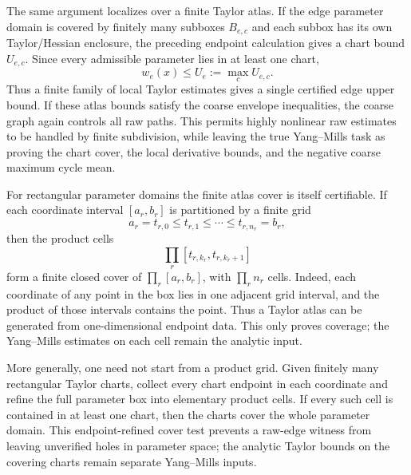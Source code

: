 The same argument localizes over a finite Taylor atlas. If the edge parameter
domain is covered by finitely many subboxes $B_{e,c}$ and each subbox has its
own Taylor/Hessian enclosure, the preceding endpoint calculation gives a
chart bound $U_{e,c}$. Since every admissible parameter lies in at least one
chart,
\[
  w_e(x)\leq U_e:=\max_c U_{e,c}.
\]
Thus a finite family of local Taylor estimates gives a single certified edge
upper bound. If these atlas bounds satisfy the coarse envelope inequalities,
the coarse graph again controls all raw paths. This permits highly nonlinear
raw estimates to be handled by finite subdivision, while leaving the true
Yang--Mills task as proving the chart cover, the local derivative bounds, and
the negative coarse maximum cycle mean.

For rectangular parameter domains the finite atlas cover is itself
certifiable. If each coordinate interval $[a_r,b_r]$ is partitioned by a
finite grid
\[
  a_r=t_{r,0}\leq t_{r,1}\leq\cdots\leq t_{r,n_r}=b_r,
\]
then the product cells
\[
  \prod_r [t_{r,k_r},t_{r,k_r+1}]
\]
form a finite closed cover of $\prod_r[a_r,b_r]$, with
$\prod_r n_r$ cells. Indeed, each coordinate of any point in the box lies in
one adjacent grid interval, and the product of those intervals contains the
point. Thus a Taylor atlas can be generated from one-dimensional endpoint
data. This only proves coverage; the Yang--Mills estimates on each cell remain
the analytic input.

More generally, one need not start from a product grid. Given finitely many
rectangular Taylor charts, collect every chart endpoint in each coordinate and
refine the full parameter box into elementary product cells. If every such
cell is contained in at least one chart, then the charts cover the whole
parameter domain. This endpoint-refined cover test prevents a raw-edge witness
from leaving unverified holes in parameter space; the analytic Taylor bounds on
the covering charts remain separate Yang--Mills inputs.


